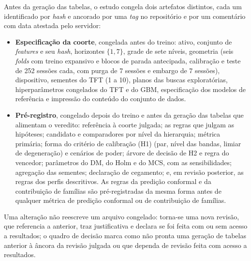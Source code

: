 Antes da geração das tabelas, o estudo congela dois artefatos distintos, cada um identificado por \textit{hash} e ancorado por uma \textit{tag} no repositório e por um comentário com data atestada pelo servidor:
\begin{itemize}
    \item \textbf{Especificação da coorte}, congelada antes do treino: ativo, conjunto de \textit{features} e seu \textit{hash}, horizontes \(\{1, 7\}\), grade de sete níveis, geometria (seis \textit{folds} com treino expansivo e blocos de parada antecipada, calibração e teste de 252 sessões cada, com purga de 7 sessões e embargo de 7 sessões), dispositivo, sementes do TFT (1 a 10), planos das buscas exploratórias, hiperparâmetros congelados do TFT e do GBM, especificação dos modelos de referência e impressão do conteúdo do conjunto de dados.
    \item \textbf{Pré-registro}, congelado depois do treino e antes da geração das tabelas que alimentam o veredito: referência à coorte julgada; as regras que julgam as hipóteses; candidato e comparadores por nível da hierarquia; métrica primária; forma do critério de calibração (H1) (par, nível das bandas, limiar de degeneração) e cenários de poder; árvore de decisão de H2 e regra do vencedor; parâmetros do DM, do Holm e do MCS, com as sensibilidades; agregação das sementes; declaração de cegamento; e, em revisão posterior, as regras dos perfis descritivos. As regras da predição conformal e da contribuição de famílias são pré-registradas da mesma forma antes de qualquer métrica de predição conformal ou de contribuição de famílias.
\end{itemize}

Uma alteração não reescreve um arquivo congelado: torna-se uma nova revisão, que referencia a anterior, traz justificativa e declara se foi feita com ou sem acesso a resultados; o quadro de decisão marca como não pronta uma geração de tabelas anterior à âncora da revisão julgada ou que dependa de revisão feita com acesso a resultados.

